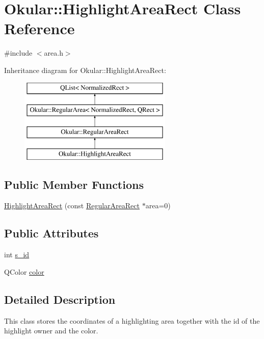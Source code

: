 \hypertarget{classOkular_1_1HighlightAreaRect}{\section{Okular\+:\+:Highlight\+Area\+Rect Class Reference}
\label{classOkular_1_1HighlightAreaRect}
}


{\ttfamily \#include $<$area.\+h$>$}

Inheritance diagram for Okular\+:\+:Highlight\+Area\+Rect\+:\begin{figure}[H]
\begin{center}
\leavevmode
\includegraphics[height=4.000000cm]{classOkular_1_1HighlightAreaRect}
\end{center}
\end{figure}
\subsection*{Public Member Functions}
\begin{DoxyCompactItemize}
\item 
\hyperlink{classOkular_1_1HighlightAreaRect_a1920454bad976a97ea7957c3f7d0b710}{Highlight\+Area\+Rect} (const \hyperlink{classOkular_1_1RegularAreaRect}{Regular\+Area\+Rect} $\ast$area=0)
\end{DoxyCompactItemize}
\subsection*{Public Attributes}
\begin{DoxyCompactItemize}
\item 
int \hyperlink{classOkular_1_1HighlightAreaRect_a12c64abbc01a387e78337732f369f413}{s\+\_\+id}
\item 
Q\+Color \hyperlink{classOkular_1_1HighlightAreaRect_aef57c61c5378267bd566824ce391727d}{color}
\end{DoxyCompactItemize}


\subsection{Detailed Description}
This class stores the coordinates of a highlighting area together with the id of the highlight owner and the color. 

